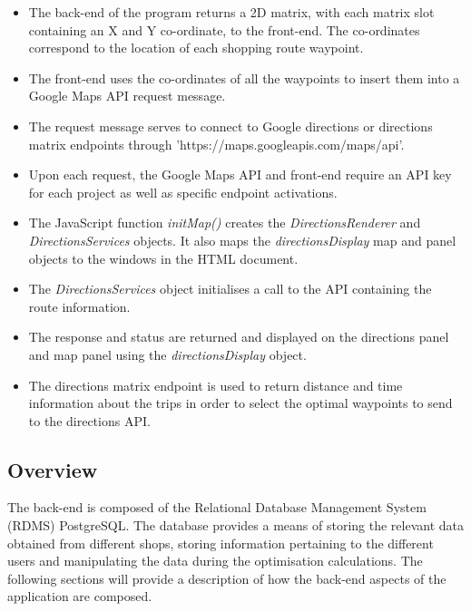 \documentclass[10pt,twocolumn]{witseiepaper}
\begin{document}
		\begin{itemize}
			\item The back-end of the program returns a 2D matrix, with each matrix slot containing an X and Y co-ordinate, to the front-end. The co-ordinates correspond to the location of each shopping route waypoint. 
			\item The front-end uses the co-ordinates of all the waypoints to insert them into a Google Maps API request message.
			\item The request message serves to connect to Google directions or directions matrix endpoints through 'https://maps.googleapis.com/maps/api'.
			\item Upon each request, the Google Maps API and front-end require an API key for each project as well as specific endpoint activations.
			\item The JavaScript function \textit{initMap()} creates the \textit{DirectionsRenderer} and \textit{DirectionsServices} objects. It also maps the \textit{directionsDisplay} map and panel objects to the windows in the HTML document.
			\item The \textit{DirectionsServices} object initialises a call to the API containing the route information.
			\item The response and status are returned and displayed on the directions panel and map panel using the \textit{directionsDisplay} object.
			\item The directions matrix endpoint is used to return distance and time information about the trips in order to select the optimal waypoints to send to the directions API.
		\end{itemize}
		
\begin{center}
\end{center}

	\subsection{Overview}
	
	The back-end is composed of the Relational Database Management System (RDMS) PostgreSQL. The database provides a means of storing the relevant data obtained from different shops, storing information pertaining to the different users and manipulating the data during the optimisation calculations. The following sections will provide a description of how the back-end aspects of the application are composed.
		
\end{document}
